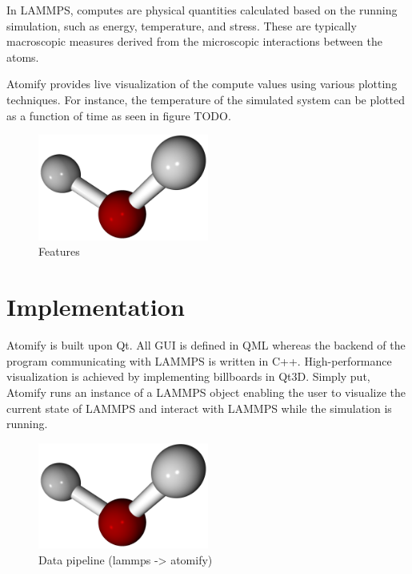 \documentclass[aps,pre,twocolumn,letterpaper,floatfix]{revtex4}
\begin{document}
In LAMMPS, computes are physical quantities calculated based on the running
simulation, such as energy, temperature, and stress.
These are typically macroscopic measures derived from the microscopic
interactions between the atoms.

Atomify provides live visualization of the compute values using various plotting
techniques.
For instance, the temperature of the simulated system can be plotted as a
function of time as seen in figure TODO.

\begin{figure}
	\centering
	\includegraphics[width=0.5\textwidth]{final_billboard.png}
	\caption{Features}
	\label{fig:gui}
\end{figure}

\section{Implementation}

Atomify is built upon Qt.
All GUI is defined in QML whereas the backend of the program communicating with
LAMMPS is written in C++.
High-performance visualization is achieved by implementing billboards in Qt3D.
Simply put, Atomify runs an instance of a LAMMPS object enabling the user to
visualize the current state of LAMMPS and interact with LAMMPS while the
simulation is running. 

\begin{figure}
	\centering
	\includegraphics[width=0.5\textwidth]{final_billboard.png}
	\caption{Data pipeline (lammps -> atomify)}
	\label{fig:gui}
\end{figure}
\end{document}

